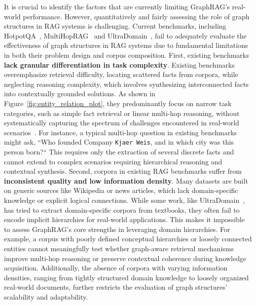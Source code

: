 \documentclass{article} %
\begin{document}
It is crucial to identify the factors that are currently limiting GraphRAG's real-world performance.
However, quantitatively and fairly assessing the role of graph structures in RAG systems is challenging.
Current benchmarks, including HotpotQA~\citep{yang2018hotpotqa}, MultiHopRAG~\citep{tang2024multihop} and UltraDomain~\citep{qian2024memorag}, fail to adequately evaluate the effectiveness of graph structures in RAG systems due to fundamental limitations in both their problem design and corpus composition. 
 First, existing benchmarks \textbf{lack granular differentiation in task complexity}.
Existing benchmarks overemphasize retrieval difficulty, locating scattered facts from corpora, while neglecting reasoning complexity, which involves synthesizing interconnected facts into contextually grounded solutions. 
As shown in Figure~\ref{fig:entity_relation_plot}, they predominantly focus on narrow task categories, such as simple fact retrieval or linear multi-hop reasoning, without systematically capturing the spectrum of challenges encountered in real-world scenarios~\citep{tang2024multihop}. For instance, a typical multi-hop question in existing benchmarks might ask, ``Who founded Company \texttt{Kjaer Weis}, and in which city was this person born?`` This requires only the extraction of several discrete facts and cannot extend to complex scenarios requiring hierarchical reasoning and contextual synthesis.
 Second, corpora in existing RAG benchmarks suffer from  \textbf{inconsistent quality and low information density}. Many datasets are built on generic sources like Wikipedia or news articles, which lack domain-specific knowledge or explicit logical connections. While some work, like UltraDomain~\citep{qian2024memorag}, has tried to extract domain-specific corpora from textbooks, they often fail to encode implicit hierarchies for real-world applications. This makes it impossible to assess GraphRAG’s core strengths in leveraging domain hierarchies. For example, a corpus with poorly defined conceptual hierarchies or loosely connected entities cannot meaningfully test whether graph-aware retrieval mechanisms improve multi-hop reasoning or preserve contextual coherence during knowledge acquisition. Additionally, the absence of corpora with varying information densities, ranging from tightly structured domain knowledge to loosely organized real-world documents, further restricts the evaluation of graph structures’ scalability and adaptability. 
\end{document}
